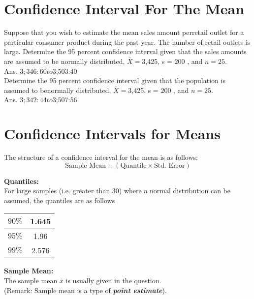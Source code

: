 \documentclass[]{report}
\begin{document}
\section{Confidence Interval For The Mean} 

Suppose that you wish to estimate the mean sales amount perretail outlet for a particular consumer product during the past year. The number of retail outlets is large. Determine the 95 percent confidence interval given that the sales amounts are assumed to be normally distributed, $\bar{X} = $3,425, s = $200$ ,
and $n = 25.$\\ Ans. $3;346:60 to $3;503:40
\\


Determine the 95 percent confidence interval given that the population is assumed to benormally distributed, $\bar{X} = $3,425, s = $200$ , and $n = 25.$
\\Ans. $3;342:44 to $3;507:56



\section{Confidence Intervals for Means}

The structure of a confidence interval for the mean is as follows:
\[ \mbox{Sample Mean} \pm  \left( \mbox{Quantile} \times \mbox{Std. Error}  \right) \]


\textbf{Quantiles:}\\
For large samples (i.e. greater than 30) where a normal distribution can be assumed, the quantiles 
are as follows\\ \bigskip
\begin{center}
\begin{tabular}{|c|c|}
\hline  $90\%$  &   1.645  \\ 
\hline  $95\%$  &   1.96  \\
\hline  $99\%$  &   2.576 \\ 
\hline 
\end{tabular} 
\end{center}


\textbf{Sample Mean:}\\
The sample mean $\bar{x}$ is usually given in the question.
\\ \bigskip
(Remark: Sample mean is a type of \textbf{\textit{point estimate}}).
\end{document}
